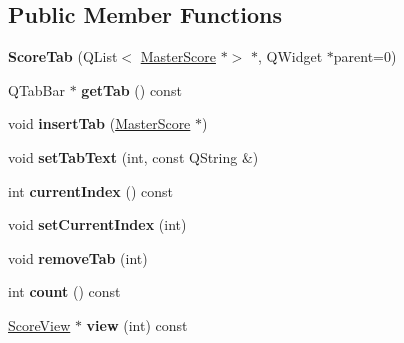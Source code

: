 \subsection*{Public Member Functions}
\begin{DoxyCompactItemize}
\item 
\mbox{\label{class_ms_1_1_score_tab_a335025d94a8d879f3a0ac130c0a2c327}} 
{\bfseries Score\+Tab} (Q\+List$<$ \hyperlink{class_ms_1_1_master_score}{Master\+Score} $\ast$$>$ $\ast$, Q\+Widget $\ast$parent=0)
\item 
\mbox{\label{class_ms_1_1_score_tab_a9a1c79fe3a1261ca0386de8e53166f18}} 
Q\+Tab\+Bar $\ast$ {\bfseries get\+Tab} () const
\item 
\mbox{\label{class_ms_1_1_score_tab_a334ee526fbf7cd5e3db116efcabb426e}} 
void {\bfseries insert\+Tab} (\hyperlink{class_ms_1_1_master_score}{Master\+Score} $\ast$)
\item 
\mbox{\label{class_ms_1_1_score_tab_a6023f0cafebd6c5553eb4398280435f1}} 
void {\bfseries set\+Tab\+Text} (int, const Q\+String \&)
\item 
\mbox{\label{class_ms_1_1_score_tab_a92a67736a8eff82a18de4e524904377f}} 
int {\bfseries current\+Index} () const
\item 
\mbox{\label{class_ms_1_1_score_tab_aac889bef7bb86520dfce92b3464c9d40}} 
void {\bfseries set\+Current\+Index} (int)
\item 
\mbox{\label{class_ms_1_1_score_tab_a346334c362c85a6182d4a95a6db9629e}} 
void {\bfseries remove\+Tab} (int)
\item 
\mbox{\label{class_ms_1_1_score_tab_a59da2e17638f26871722c98d62e2590c}} 
int {\bfseries count} () const
\item 
\mbox{\label{class_ms_1_1_score_tab_a261c98022c1b2e0134b47fc92c5b1d13}} 
\hyperlink{class_ms_1_1_score_view}{Score\+View} $\ast$ {\bfseries view} (int) const
\item 
\mbox{\label{class_ms_1_1_score_tab_ac287c570fd43b2d1e102185d7848043f}} 
$$
\end{DoxyCompactItemize}
